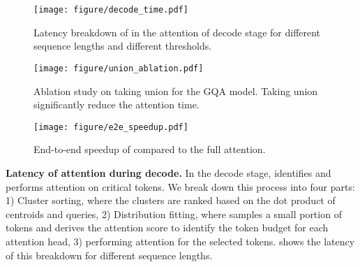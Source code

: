 \begin{table}[]
\centering
\caption{Comparison of clustering time and prefill time. Getting distance between K-vectors and cluster centroid dominates the clustering time. For all sequence lengths, clustering overhead is negligible compared to prefill. }
\vspace{0.1in}
\footnotesize
{}
\label{tab:cluster_time}
\vspace{-0.1in}
\end{table}

\begin{figure}[t]
    \centering
    \texttt{[image: figure/decode\_time.pdf]}
    \caption{Latency breakdown of \sys in the attention of decode stage for different sequence lengths and different thresholds.}
    \label{fig:decoding_time}
\end{figure}
\begin{figure}[t]
    \centering
    \texttt{[image: figure/union\_ablation.pdf]}
    \caption{Ablation study on taking union for the GQA model. Taking union significantly reduce the attention time. }
    \label{fig:union}
\end{figure}
\begin{figure}[t]
    \centering
    \texttt{[image: figure/e2e\_speedup.pdf]}
    \caption{End-to-end speedup of \sys compared to the full attention.}
    \label{fig:e2e_speedup}
\end{figure}

\textbf{Latency of attention during decode.}
In the decode stage, \sys identifies and performs attention on critical tokens. We break down this process into four parts: 1) Cluster sorting, where the clusters are ranked based on the dot product of centroids and queries, 2) Distribution fitting, where \sys samples a small portion of tokens and derives the attention score to identify the token budget for each attention head, 3) performing attention for the selected tokens.  shows the latency of this breakdown for different sequence lengths. 

